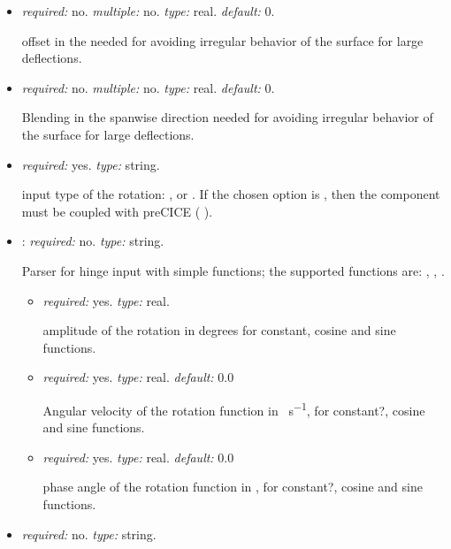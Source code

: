 \begin{itemize}
    \item {} \textit{required:} no. \textit{multiple:} no. \textit{type:} real. \textit{default:} 0.
    
    offset in the  needed for avoiding irregular behavior of the surface for large deflections.

    \item {} \textit{required:} no. \textit{multiple:} no. \textit{type:} real. \textit{default:} 0.
    
    Blending in the spanwise direction needed for avoiding irregular behavior of the surface for large deflections.
    
    \item {}
    \textit{required:} yes. \textit{type:} string.
    
    input type of the rotation: ,  or . 
    If the chosen option is , then the component must be coupled with preCICE ( ).
    
    \item {}: \textit{required:} no. \textit{type:} string. 
    
    Parser for hinge input with simple functions; the supported functions are: 
    , , . 
    \begin{itemize}
        \item {} \textit{required:} yes. \textit{type:} real. 
        
        amplitude of the rotation in degrees for constant, cosine and sine functions. 
        
        \item {} \textit{required:} yes. \textit{type:} real. \textit{default:} 0.0 
        
        Angular velocity of the rotation function in \si{\deg\per\second}, for constant?, cosine and sine functions.
        
        \item {} \textit{required:} yes. \textit{type:} real. \textit{default:} 0.0
        
        phase angle of the rotation function in \si{\deg}, for constant?, cosine and sine functions.
    \end{itemize}
    \item {} \textit{required:} no. \textit{type:} string. 
    

\end{itemize}
